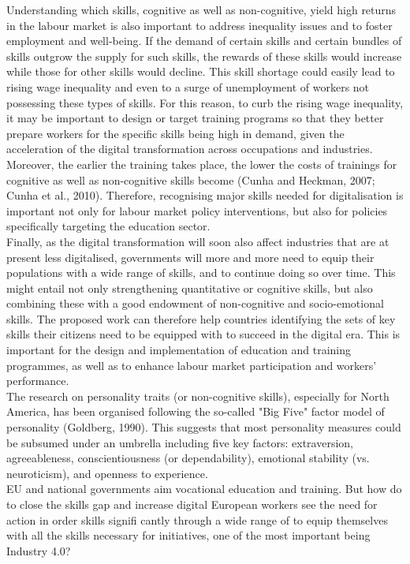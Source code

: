 Understanding which skills, cognitive as well as non-cognitive, yield high returns in the labour market is also important to address inequality issues and to foster employment and well-being. If the demand of certain skills and certain bundles of skills outgrow the supply for such skills, the rewards of these skills would increase while those for other skills would decline. This skill shortage could easily lead to rising wage inequality and even to a surge of unemployment of workers not possessing these types of skills. For this reason, to curb the rising wage inequality, it may be important to design or target training programs so that they better prepare workers for the specific skills being high in demand, given the acceleration of the digital transformation across occupations and industries. Moreover, the earlier the training takes place, the lower the costs of trainings for cognitive as well as non-cognitive skills become (Cunha and Heckman, 2007; Cunha et al., 2010). Therefore, recognising major skills needed for digitalisation is important not only for labour market policy interventions, but also for policies specifically targeting the education sector.\\

Finally, as the digital transformation will soon also affect industries that are at present less digitalised, governments will more and more need to equip their populations with a wide range of skills, and to continue doing so over time. This might entail not only strengthening quantitative or cognitive skills, but also combining these with a good endowment of non-cognitive and socio-emotional skills. The proposed work can therefore help countries identifying the sets of key skills their citizens need to be equipped with to succeed in the digital era. This is important for the design and implementation of education and training programmes, as well as to enhance labour market participation and workers’ performance.\\

The research on personality traits (or non-cognitive skills), especially for North America, has been organised following the so-called "Big Five" factor model of personality (Goldberg, 1990). This suggests that most personality measures could be subsumed under an umbrella including five key factors:
extraversion, agreeableness, conscientiousness (or dependability), emotional stability (vs. neuroticism), and openness to experience.\\


EU and national governments aim vocational education and training. But how do
to close the skills gap and increase digital European workers see the need for action in order skills signifi cantly through a wide range of to equip themselves with all the skills necessary for initiatives, one of the most important being Industry 4.0?




